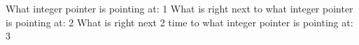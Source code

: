 What integer pointer is pointing at: 1
What is right next to what integer pointer is pointing at: 2
What is right next 2 time to what integer pointer is pointing at: 3
